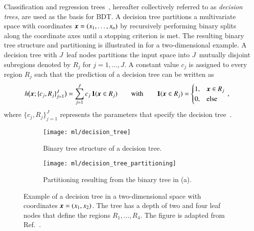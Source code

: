 Classification and regression trees~\cite{Breiman:1984jka,hastie09}, hereafter
collectively referred to as \emph{decision trees}, are used as the basis for
BDT. A decision tree partitions a multivariate space with coordinates
$\myvec{x} = (x_1, \dots, x_n)$ by recursively performing binary splits along
the coordinate axes until a stopping criterion is met. The resulting binary tree
structure and partitioning is illustrated in  for a
two-dimensional example. A decision tree with $J$~leaf nodes partitions the
input space into $J$~mutually disjoint subregions denoted by $R_j$ for
$j = 1, \dots, J$. A constant value $c_j$ is assigned to every region $R_j$ such
that the prediction of a decision tree can be written as
\begin{align*}
  h\bigl( \myvec{x}; \{c_j, R_j\}_{j=1}^{J} \bigr) = \sum_{j = 1}^{J} c_j \, \mathbf{1}(\myvec{x} \in R_j) \qquad \text{with} \qquad \mathbf{1}(\myvec{x} \in R_j) =
  \begin{cases}
    1, & \myvec{x} \in R_j \\
    0, & \text{else}
  \end{cases} \,\text{,}
\end{align*}
where $\{c_j, R_j\}_{j=1}^{J}$ represents the parameters that specify the
decision tree~\cite{hastie09}.

\begin{figure}[htbp]
  \centering

  \begin{subfigure}[b]{0.46\textwidth}
    \centering
    \texttt{[image: ml/decision\_tree]}
    \caption{Binary tree structure of a decision tree.}
  \end{subfigure}\hfill%
  \begin{subfigure}[b]{0.46\textwidth}
    \centering
    \texttt{[image: ml/decision\_tree\_partitioning]}
    \vspace*{0.7em}
    \caption{Partitioning resulting from the binary tree in (a).}
  \end{subfigure}\hfill%

  \caption{Example of a decision tree in a two-dimensional space with
    coordinates $\myvec{x} = (x_1, x_2)$. The tree has a depth of two and four
    leaf nodes that define the regions $R_1, \dots, R_4$. The figure is adapted
    from Ref.~\cite{hastie09}.}%
  \label{fig:decision_tree}
\end{figure}

